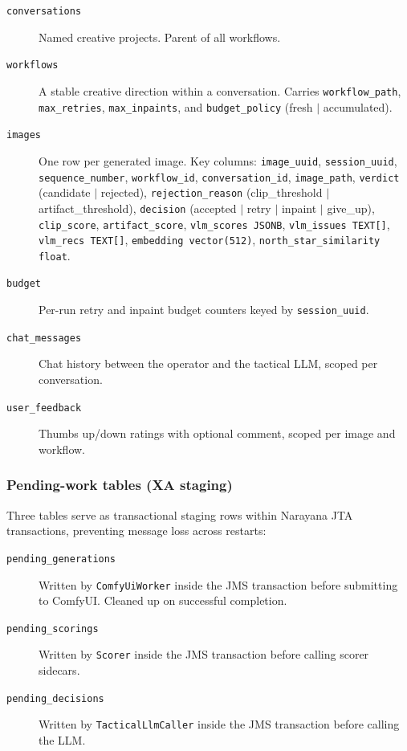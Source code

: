 \documentclass[11pt,letterpaper]{article}
\begin{document}
\begin{description}
  \item[\texttt{conversations}] Named creative projects. Parent of all workflows.
  \item[\texttt{workflows}] A stable creative direction within a conversation.
        Carries \texttt{workflow\_path}, \texttt{max\_retries},
        \texttt{max\_inpaints}, and \texttt{budget\_policy} (fresh $|$ accumulated).
  \item[\texttt{images}] One row per generated image. Key columns:
        \texttt{image\_uuid}, \texttt{session\_uuid}, \texttt{sequence\_number},
        \texttt{workflow\_id}, \texttt{conversation\_id}, \texttt{image\_path},
        \texttt{verdict} (candidate $|$ rejected),
        \texttt{rejection\_reason} (clip\_threshold $|$ artifact\_threshold),
        \texttt{decision} (accepted $|$ retry $|$ inpaint $|$ give\_up),
        \texttt{clip\_score}, \texttt{artifact\_score},
        \texttt{vlm\_scores JSONB}, \texttt{vlm\_issues TEXT[]},
        \texttt{vlm\_recs TEXT[]},
        \texttt{embedding vector(512)}, \texttt{north\_star\_similarity float}.
  \item[\texttt{budget}] Per-run retry and inpaint budget counters keyed by
        \texttt{session\_uuid}.
  \item[\texttt{chat\_messages}] Chat history between the operator and the
        tactical LLM, scoped per conversation.
  \item[\texttt{user\_feedback}] Thumbs up/down ratings with optional comment,
        scoped per image and workflow.
\end{description}

\subsubsection{Pending-work tables (XA staging)}

Three tables serve as transactional staging rows within Narayana JTA
transactions, preventing message loss across restarts:

\begin{description}
  \item[\texttt{pending\_generations}] Written by \texttt{ComfyUiWorker}
        inside the JMS transaction before submitting to ComfyUI. Cleaned up
        on successful completion.
  \item[\texttt{pending\_scorings}] Written by \texttt{Scorer} inside the
        JMS transaction before calling scorer sidecars.
  \item[\texttt{pending\_decisions}] Written by \texttt{TacticalLlmCaller}
        inside the JMS transaction before calling the LLM.
\end{description}
\end{document}
